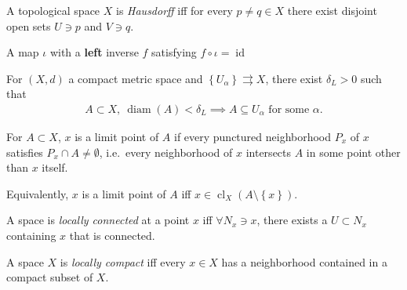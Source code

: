 \begin{definition}[Hausdorff]

A topological space \(X\) is \emph{Hausdorff} iff for every
\(p\neq q \in X\) there exist disjoint open sets \(U\ni p\) and
\(V\ni q\).

\end{definition}

\begin{definition}[Injection]

A map \(\iota\) with a \textbf{left} inverse \(f\) satisfying
\(f\circ \iota = \operatorname{id}\)

\end{definition}

\begin{definition}

For \((X, d)\) a compact metric space and
\(\left\{{U_\alpha}\right\}\rightrightarrows X\), there exist
\(\delta_{L} > 0\) such that
\begin{align*}
A\subset X, ~ {\operatorname{diam}}(A) < \delta_{L} \implies A\subseteq U_\alpha \text{ for some } \alpha
.\end{align*}

\end{definition}

\begin{definition}

For \(A\subset X\), \(x\) is a limit point of \(A\) if every punctured
neighborhood \(P_{x}\) of \(x\) satisfies
\(P_{x} \cap A \neq \emptyset\), i.e.~every neighborhood of \(x\)
intersects \(A\) in some point other than \(x\) itself.

Equivalently, \(x\) is a limit point of \(A\) iff
\(x\in \operatorname{cl}_{X}(A\setminus\left\{{x}\right\})\).

\end{definition}

\begin{definition}

A space is \emph{locally connected} at a point \(x\) iff
\(\forall N_{x} \ni x\), there exists a \(U\subset N_{x}\) containing
\(x\) that is connected.

\end{definition}

\begin{definition}

A space \(X\) is \emph{locally compact} iff every \(x\in X\) has a
neighborhood contained in a compact subset of \(X\).

\end{definition}

